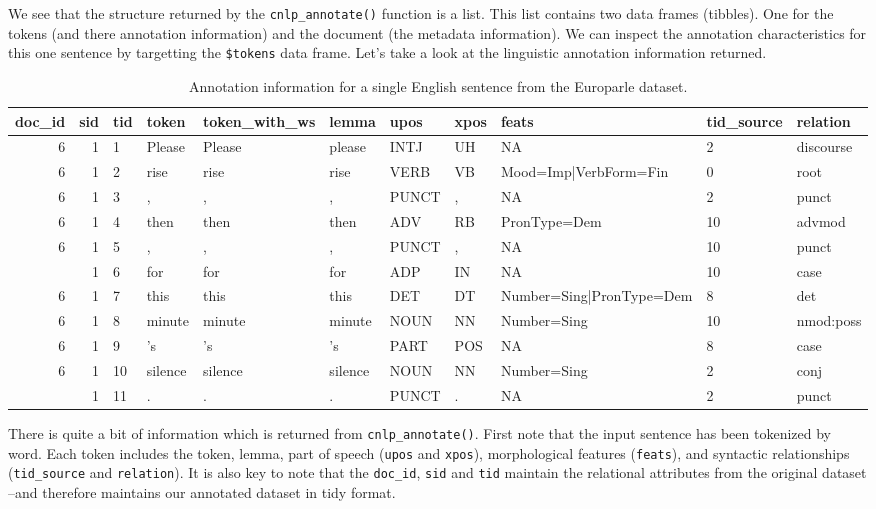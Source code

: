 \documentclass[
]{article}
\begin{document}
We see that the structure returned by the \texttt{cnlp\_annotate()} function is a list. This list contains two data frames (tibbles). One for the tokens (and there annotation information) and the document (the metadata information). We can inspect the annotation characteristics for this one sentence by targetting the \texttt{\$tokens} data frame. Let's take a look at the linguistic annotation information returned.

\begin{table}

\caption{\label{tab:td-generation-test-annotation-english}Annotation information for a single English sentence from the Europarle dataset.}
\centering
\begin{tabular}[t]{rrlllllllll}
\toprule
doc\_id & sid & tid & token & token\_with\_ws & lemma & upos & xpos & feats & tid\_source & relation\\
\midrule
6 & 1 & 1 & Please & Please & please & INTJ & UH & NA & 2 & discourse\\
6 & 1 & 2 & rise & rise & rise & VERB & VB & Mood=Imp|VerbForm=Fin & 0 & root\\
6 & 1 & 3 & , & , & , & PUNCT & , & NA & 2 & punct\\
6 & 1 & 4 & then & then & then & ADV & RB & PronType=Dem & 10 & advmod\\
6 & 1 & 5 & , & , & , & PUNCT & , & NA & 10 & punct\\
\addlinespace
6 & 1 & 6 & for & for & for & ADP & IN & NA & 10 & case\\
6 & 1 & 7 & this & this & this & DET & DT & Number=Sing|PronType=Dem & 8 & det\\
6 & 1 & 8 & minute & minute & minute & NOUN & NN & Number=Sing & 10 & nmod:poss\\
6 & 1 & 9 & 's & 's & 's & PART & POS & NA & 8 & case\\
6 & 1 & 10 & silence & silence & silence & NOUN & NN & Number=Sing & 2 & conj\\
\addlinespace
6 & 1 & 11 & . & . & . & PUNCT & . & NA & 2 & punct\\
\bottomrule
\end{tabular}
\end{table}

There is quite a bit of information which is returned from \texttt{cnlp\_annotate()}. First note that the input sentence has been tokenized by word. Each token includes the token, lemma, part of speech (\texttt{upos} and \texttt{xpos}), morphological features (\texttt{feats}), and syntactic relationships (\texttt{tid\_source} and \texttt{relation}). It is also key to note that the \texttt{doc\_id}, \texttt{sid} and \texttt{tid} maintain the relational attributes from the original dataset --and therefore maintains our annotated dataset in tidy format.
\end{document}
